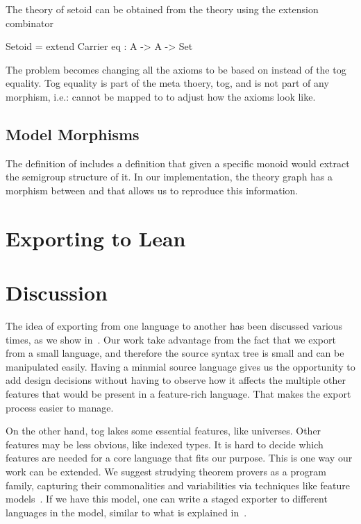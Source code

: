 The theory of setoid can be obtained from the  theory using the extension combinator 
\begin{togcode}
Setoid = extend Carrier {eq : A -> A -> Set}
\end{togcode}
The problem becomes changing all the axioms to be based on  instead of the tog equality. Tog equality is part of the meta thoery, tog, and is not part of any morphism, i.e.: cannot be mapped to  to adjust how the axioms look like. 


\subsection{Model Morphisms} 
\label{subsec:model-morph}
\label{subsec:agda:modelMorphisms}
The definition of  includes a  definition that given a specific monoid would extract the semigroup structure of it. In our implementation, the theory graph has a morphism between  and  that allows us to reproduce this information. 

\section{Exporting to Lean}
\label{sec:exporting_lean}

\section{Discussion}
\label{sec:exporting:discussion}
The idea of exporting from one language to another has been discussed various times, as we show in~. Our work take advantage from the fact that we export from a small language, and therefore the source syntax tree is small and can be manipulated easily. Having a minmial source language gives us the opportunity to add design decisions without having to observe how it affects the multiple other features that would be present in a feature-rich language. That makes the export process easier to manage. 

On the other hand, tog lakes some essential features, like universes. Other features may be less obvious, like indexed types. It is hard to decide which features are needed for a core language that fits our purpose. This is one way our work can be extended. We suggest strudying theorem provers as a program family, capturing their commonalities and variabilities via techniques like feature models~\cite{czarnecki2000generative}. If we have this model, one can write a staged exporter to different languages in the model, similar to what is explained in~\cite{stagedConfig}. 

